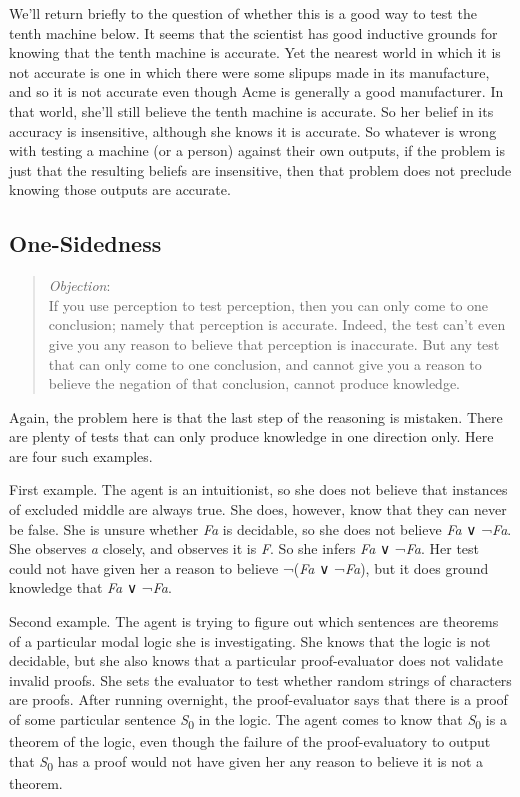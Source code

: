 \documentclass[
  10pt,
  letterpaper,
  twoside]{scrbook}
\begin{document}
We'll return briefly to the question of whether this is a good way to
test the tenth machine below. It seems that the scientist has good
inductive grounds for knowing that the tenth machine is accurate. Yet
the nearest world in which it is not accurate is one in which there were
some slipups made in its manufacture, and so it is not accurate even
though Acme is generally a good manufacturer. In that world, she'll
still believe the tenth machine is accurate. So her belief in its
accuracy is insensitive, although she knows it is accurate. So whatever
is wrong with testing a machine (or a person) against their own outputs,
if the problem is just that the resulting beliefs are insensitive, then
that problem does not preclude knowing those outputs are accurate.

\subsection{One-Sidedness}\label{one-sidedness}

\begin{quote}
\emph{Objection}:\\
If you use perception to test perception, then you can only come to one
conclusion; namely that perception is accurate. Indeed, the test can't
even give you any reason to believe that perception is inaccurate. But
any test that can only come to one conclusion, and cannot give you a
reason to believe the negation of that conclusion, cannot produce
knowledge.
\end{quote}

Again, the problem here is that the last step of the reasoning is
mistaken. There are plenty of tests that can only produce knowledge in
one direction only. Here are four such examples.

First example. The agent is an intuitionist, so she does not believe
that instances of excluded middle are always true. She does, however,
know that they can never be false. She is unsure whether \emph{Fa} is
decidable, so she does not believe \emph{Fa} ∨ ¬\emph{Fa}. She observes
\emph{a} closely, and observes it is \emph{F}. So she infers \emph{Fa} ∨
¬\emph{Fa}. Her test could not have given her a reason to believe
¬(\emph{Fa} ∨ ¬\emph{Fa}), but it does ground knowledge that \emph{Fa} ∨
¬\emph{Fa}.

Second example. The agent is trying to figure out which sentences are
theorems of a particular modal logic she is investigating. She knows
that the logic is not decidable, but she also knows that a particular
proof-evaluator does not validate invalid proofs. She sets the evaluator
to test whether random strings of characters are proofs. After running
overnight, the proof-evaluator says that there is a proof of some
particular sentence \emph{S}\textsubscript{0} in the logic. The agent
comes to know that \emph{S}\textsubscript{0} is a theorem of the logic,
even though the failure of the proof-evaluatory to output that
\emph{S}\textsubscript{0} has a proof would not have given her any
reason to believe it is not a theorem.
\end{document}

